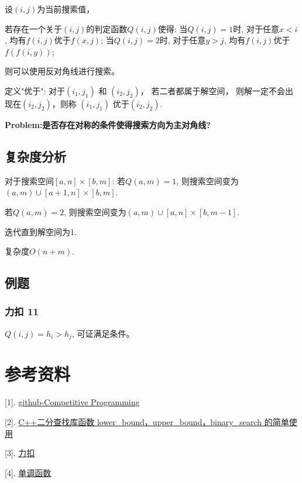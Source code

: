\documentclass{article}
\begin{document}
    设$(i, j)$为当前搜索值， 
    
    若存在一个关于$(i,j)$的判定函数$Q(i, j)$使得:
    当$Q(i, j) = 1$时, 对于任意$x<i$, 均有$f(i, j)$优于$f(x, j)$;
    当$Q(i, j) = 2$时, 对于任意$y>j$, 均有$f(i,j)$优于$f(f(i, y))$;

    则可以使用反对角线进行搜索。

    定义"优于": 对于$(i_1,j_1)$ 和 $(i_2, j_2)$， 若二者都属于解空间， 则解一定不会出现在$(i_2, j_2)$，则称
    $(i_1, j_1)$ 优于$(i_2, j_2)$.

    \textbf{Problem:是否存在对称的条件使得搜索方向为主对角线?}


    \subsection{复杂度分析}
    对于搜索空间$[a, n] \times [b, m]$:
    若$Q(a, m) = 1$, 则搜索空间变为$(a, m) \cup [a+1, n] \times[b, m]$.
    
    若$Q(a, m) = 2$, 则搜索空间变为$(a, m) \cup [a, n] \times[b, m-1]$.

    迭代直到解空间为1.

    复杂度$O(n + m)$.

    \subsection{例题}
    \subsubsection{力扣 11}
    $Q(i, j) = h_i > h_j$, 可证满足条件。

    

    \section*{参考资料}

    [1]. \href{https://github.com/JatinDholakia/Competitive-Programming}{github-Competitive Programming}

    [2]. \href{https://blog.csdn.net/weixin_44176696/article/details/104200660}{C++二分查找库函数 lower\_bound，upper\_bound，binary\_search 的简单使用}

    [3]. \href{https://leetcode.cn/}{力扣}

    [4]. \href{https://www.wikiwand.com/zh-sg/%E5%8D%95%E8%B0%83%E5%87%BD%E6%95%B0}{单调函数}
\end{document}

